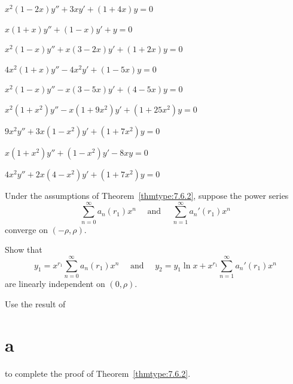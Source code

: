 \begin{exerciselist}
  \item\label{exer:7.6.44} $x^{2}(1-2x)y''+3xy'+(1+4x)y=0$

  \item\label{exer:7.6.45} $x(1+x)y''+(1-x)y'+y=0$

  \item\label{exer:7.6.46} $x^{2}(1-x)y''+x(3-2x)y'+(1+2x)y=0$

  \item\label{exer:7.6.47} $4x^{2}(1+x)y''-4x^{2}y'+(1-5x)y=0$

  \item\label{exer:7.6.48} $x^{2}(1-x)y''-x(3-5x)y'+(4-5x)y=0$

  \item\label{exer:7.6.49} $x^{2}(1+x^{2})y''-x(1+9x^{2})y'+(1+25x^{2})y=0$

  \item\label{exer:7.6.50} $9x^{2}y''+3x(1-x^{2})y'+(1+7x^{2})y=0$

  \item\label{exer:7.6.51} $x(1+x^{2})y''+(1-x^{2})y'-8xy=0$

  \item\label{exer:7.6.52} $4x^{2}y''+2x(4-x^{2})y'+(1+7x^{2})y=0$

  \item\label{exer:7.6.53} Under the assumptions of Theorem~\ref{thmtype:7.6.2}, suppose the power
        series
  \[
    \sum_{n=0}^{\infty}a_{n}(r_{1})x^{n}\quad\mbox{ and }\quad \sum_{n=1}^{\infty}a_{n}'(r_{1})x^{n}
  \]
  converge on $(-\rho,\rho)$.
  \begin{alist}
    \item %
    Show that
    \[
      y_{1}=x^{r_{1}}\sum_{n=0}^{\infty}a_{n}(r_{1})x^{n}\quad\mbox{ and }\quad y_{2}=y_{1}\ln x+x^{r_{1}}\sum_{n=1}^{\infty}a_{n}'(r_{1})x^{n}
    \]
    are linearly independent on $(0,\rho)$. 

    \item %
    Use the result of \part{a} to complete the proof of Theorem~\ref{thmtype:7.6.2}.
  \end{alist}


\end{exerciselist}
